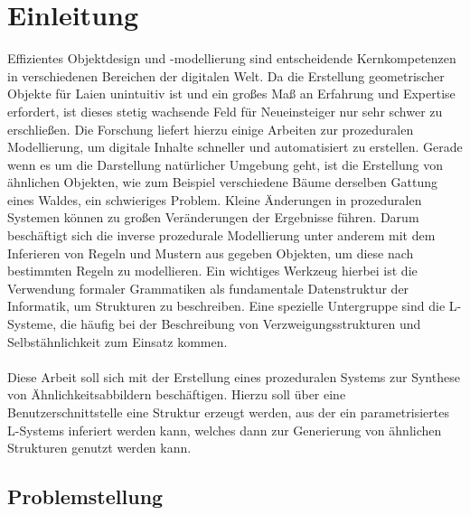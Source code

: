 
\chapter{Einleitung}
Effizientes Objektdesign und -modellierung sind entscheidende Kernkompetenzen in verschiedenen Bereichen der
digitalen Welt.
Da die Erstellung geometrischer Objekte für Laien unintuitiv ist und ein großes Maß an Erfahrung und Expertise
erfordert, ist dieses stetig wachsende Feld für Neueinsteiger nur sehr schwer zu erschließen.
Die Forschung liefert hierzu einige Arbeiten zur prozeduralen Modellierung, um digitale Inhalte schneller
und automatisiert zu erstellen.
Gerade wenn es um die Darstellung natürlicher Umgebung geht, ist die Erstellung von ähnlichen Objekten, wie
zum Beispiel verschiedene Bäume derselben Gattung eines Waldes, ein schwieriges Problem.
Kleine Änderungen in prozeduralen Systemen können zu großen Veränderungen der Ergebnisse führen.
Darum beschäftigt sich die inverse prozedurale Modellierung unter anderem mit dem Inferieren von Regeln
und Mustern aus gegeben Objekten, um diese nach bestimmten Regeln zu modellieren.
Ein wichtiges Werkzeug hierbei ist die Verwendung formaler Grammatiken als fundamentale Datenstruktur
der Informatik, um Strukturen zu beschreiben.
Eine spezielle Untergruppe sind die L-Systeme, die häufig bei der Beschreibung
von Verzweigungsstrukturen und Selbstähnlichkeit zum Einsatz kommen.
\\~\\
Diese Arbeit soll sich mit der Erstellung eines prozeduralen Systems zur Synthese von Ähnlichkeitsabbildern
beschäftigen.
Hierzu soll über eine Benutzerschnittstelle eine Struktur erzeugt werden, aus der ein parametrisiertes L-Systems
inferiert werden kann, welches dann zur Generierung von ähnlichen Strukturen genutzt werden kann.

\newpage

\section{Problemstellung}

